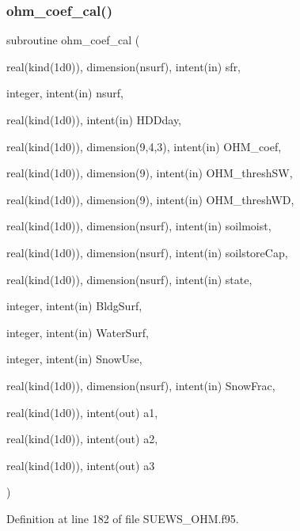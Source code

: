 \subsubsection{\texorpdfstring{ohm\+\_\+coef\+\_\+cal()}{ohm\_coef\_cal()}}
{\footnotesize\ttfamily subroutine ohm\+\_\+coef\+\_\+cal (\begin{DoxyParamCaption}\item[{real(kind(1d0)), dimension(nsurf), intent(in)}]{sfr,  }\item[{integer, intent(in)}]{nsurf,  }\item[{real(kind(1d0)), intent(in)}]{H\+D\+Dday,  }\item[{real(kind(1d0)), dimension(9,4,3), intent(in)}]{O\+H\+M\+\_\+coef,  }\item[{real(kind(1d0)), dimension(9), intent(in)}]{O\+H\+M\+\_\+thresh\+SW,  }\item[{real(kind(1d0)), dimension(9), intent(in)}]{O\+H\+M\+\_\+thresh\+WD,  }\item[{real(kind(1d0)), dimension(nsurf), intent(in)}]{soilmoist,  }\item[{real(kind(1d0)), dimension(nsurf), intent(in)}]{soilstore\+Cap,  }\item[{real(kind(1d0)), dimension(nsurf), intent(in)}]{state,  }\item[{integer, intent(in)}]{Bldg\+Surf,  }\item[{integer, intent(in)}]{Water\+Surf,  }\item[{integer, intent(in)}]{Snow\+Use,  }\item[{real(kind(1d0)), dimension(nsurf), intent(in)}]{Snow\+Frac,  }\item[{real(kind(1d0)), intent(out)}]{a1,  }\item[{real(kind(1d0)), intent(out)}]{a2,  }\item[{real(kind(1d0)), intent(out)}]{a3 }\end{DoxyParamCaption})}



Definition at line 182 of file S\+U\+E\+W\+S\+\_\+\+O\+H\+M.\+f95.

\mbox{\label{_s_u_e_w_s___o_h_m_8f95_aab92e372bc8d7a7394e70e0c6e7a1f21}} 
